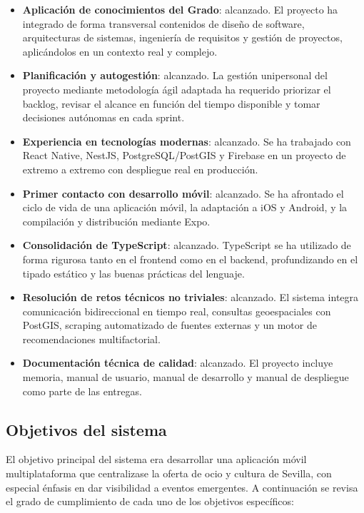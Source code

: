 \begin{itemize}
    \item \textbf{Aplicación de conocimientos del Grado}: alcanzado. El proyecto ha integrado de forma transversal contenidos de diseño de software, arquitecturas de sistemas, ingeniería de requisitos y gestión de proyectos, aplicándolos en un contexto real y complejo.

    \item \textbf{Planificación y autogestión}: alcanzado. La gestión unipersonal del proyecto mediante metodología ágil adaptada ha requerido priorizar el backlog, revisar el alcance en función del tiempo disponible y tomar decisiones autónomas en cada sprint.

    \item \textbf{Experiencia en tecnologías modernas}: alcanzado. Se ha trabajado con React Native, NestJS, PostgreSQL/PostGIS y Firebase en un proyecto de extremo a extremo con despliegue real en producción.

    \item \textbf{Primer contacto con desarrollo móvil}: alcanzado. Se ha afrontado el ciclo de vida de una aplicación móvil, la adaptación a iOS y Android, y la compilación y distribución mediante Expo.

    \item \textbf{Consolidación de TypeScript}: alcanzado. TypeScript se ha utilizado de forma rigurosa tanto en el frontend como en el backend, profundizando en el tipado estático y las buenas prácticas del lenguaje.

    \item \textbf{Resolución de retos técnicos no triviales}: alcanzado. El sistema integra comunicación bidireccional en tiempo real, consultas geoespaciales con PostGIS, scraping automatizado de fuentes externas y un motor de recomendaciones multifactorial.

    \item \textbf{Documentación técnica de calidad}: alcanzado. El proyecto incluye memoria, manual de usuario, manual de desarrollo y manual de despliegue como parte de las entregas.
\end{itemize}

\subsection{Objetivos del sistema}

El objetivo principal del sistema era desarrollar una aplicación móvil multiplataforma que centralizase la oferta de ocio y cultura de Sevilla, con especial énfasis en dar visibilidad a eventos emergentes. A continuación se revisa el grado de cumplimiento de cada uno de los objetivos específicos:

